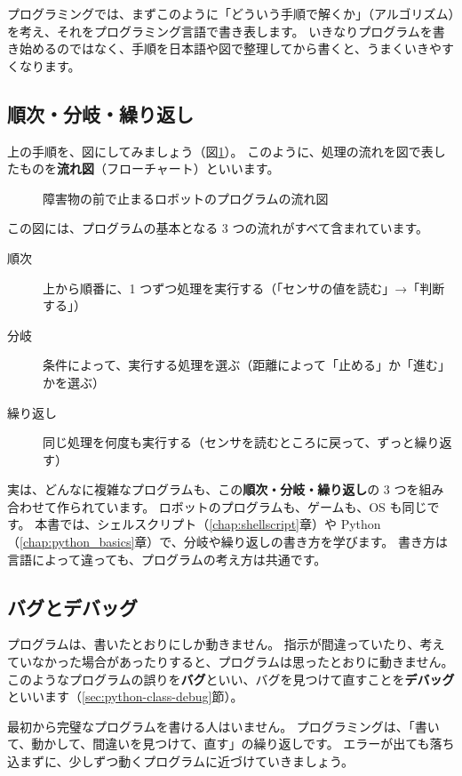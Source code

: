 プログラミングでは、まずこのように「どういう手順で解くか」（アルゴリズム）を考え、それをプログラミング言語で書き表します。
いきなりプログラムを書き始めるのではなく、手順を日本語や図で整理してから書くと、うまくいきやすくなります。

\subsection{順次・分岐・繰り返し}

上の手順を、図にしてみましょう（図\ref{fig:computer-flowchart}）。
このように、処理の流れを図で表したものを\textbf{流れ図}（フローチャート）といいます。

\begin{figure}[tb]
  \centering
  
  \caption{障害物の前で止まるロボットのプログラムの流れ図}
  \label{fig:computer-flowchart}
\end{figure}

この図には、プログラムの基本となる 3 つの流れがすべて含まれています。

\begin{description}
  \item[順次] 上から順番に、1 つずつ処理を実行する（「センサの値を読む」→「判断する」）
  \item[分岐] 条件によって、実行する処理を選ぶ（距離によって「止める」か「進む」かを選ぶ）
  \item[繰り返し] 同じ処理を何度も実行する（センサを読むところに戻って、ずっと繰り返す）
\end{description}

実は、どんなに複雑なプログラムも、この\textbf{順次・分岐・繰り返し}の 3 つを組み合わせて作られています。
ロボットのプログラムも、ゲームも、OS も同じです。
本書では、シェルスクリプト（\ref{chap:shellscript}章）や Python（\ref{chap:python_basics}章）で、分岐や繰り返しの書き方を学びます。
書き方は言語によって違っても、プログラムの考え方は共通です。

\subsection{バグとデバッグ}

プログラムは、書いたとおりにしか動きません。
指示が間違っていたり、考えていなかった場合があったりすると、プログラムは思ったとおりに動きません。
このようなプログラムの誤りを\textbf{バグ}といい、バグを見つけて直すことを\textbf{デバッグ}といいます（\ref{sec:python-class-debug}節）。

最初から完璧なプログラムを書ける人はいません。
プログラミングは、「書いて、動かして、間違いを見つけて、直す」の繰り返しです。
エラーが出ても落ち込まずに、少しずつ動くプログラムに近づけていきましょう。

